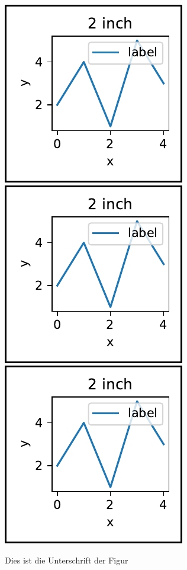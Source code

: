 \documentclass[a4paper, 12pt]{scrartcl}
\begin{document}
\begin{figure}[h]
   \includegraphics{figur_2}
   \includegraphics{figur_2}
   \includegraphics{figur_2}
   \caption{Dies ist die Unterschrift der Figur}
\end{figure}
%
\end{document}
